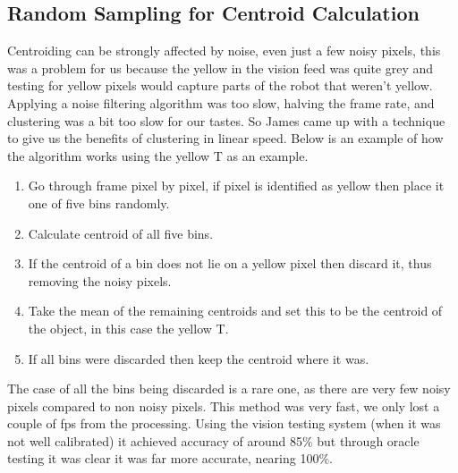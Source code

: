 \subsection{Random Sampling for Centroid Calculation}

Centroiding can be strongly affected by noise, even just a few noisy pixels, this was a problem for us because the yellow in the vision feed was quite grey and testing for yellow pixels would capture parts of the robot that weren't yellow.  Applying a noise filtering algorithm was too slow, halving the frame rate, and clustering was a bit too slow for our tastes.  So James came up with a technique to give us the benefits of clustering in linear speed.  Below is an example of how the algorithm works using the yellow T as an example.
\begin{enumerate}
\item Go through frame pixel by pixel, if pixel is identified as yellow then place it one of five bins randomly.
\item Calculate centroid of all five bins.
\item If the centroid of a bin does not lie on a yellow pixel then discard it, thus removing the noisy pixels.
\item Take the mean of the remaining centroids and set this to be the centroid of the object, in this case the yellow T.
\item If all bins were discarded then keep the centroid where it was.
\end{enumerate}

The case of all the bins being discarded is a rare one, as there are very few noisy pixels compared to non noisy pixels.  This method was very fast, we only lost a couple of fps from the processing.  Using the vision testing system (when it was not well calibrated) it achieved accuracy of around 85\% but through oracle testing it was clear it was far more accurate, nearing 100\%.




